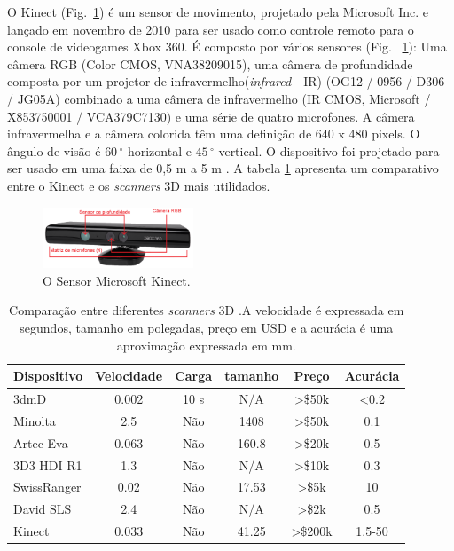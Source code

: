 O Kinect (Fig.~\ref{fig:kinect}) é um sensor de movimento, projetado pela Microsoft Inc. e lançado em novembro de 2010 para ser usado como controle remoto para o console de videogames Xbox 360. É composto por vários sensores (Fig. ~\ref{fig:kinect}): Uma câmera RGB (Color CMOS, VNA38209015), uma câmera de profundidade composta por um projetor de infravermelho(\textit{infrared} - IR) (OG12 / 0956 / D306 / JG05A) combinado a uma câmera de infravermelho (IR CMOS, Microsoft / X853750001 / VCA379C7130) e uma série de quatro microfones. A câmera infravermelha e a câmera colorida têm uma definição de 640 x 480 pixels. O ângulo de visão é $60\,^{\circ}$ horizontal e $45\,^{\circ}$ vertical. O dispositivo foi projetado para ser usado em uma faixa de 0,5 m a 5 m \cite{sevrin2015characterization}. A tabela \ref{table:comparativoScanners} apresenta um comparativo entre o Kinect e os \textit{scanners} 3D mais utilidados.

 \begin{figure}[h]
\centering
    \includegraphics[resolution=300,width=0.4\textwidth,natwidth=610,natheight=642]{images/kinect.png}
    \caption{O Sensor Microsoft Kinect.}
    \label{fig:kinect}
\end{figure}


 \begin{table}[h]
 \caption{Comparação entre diferentes \textit{scanners} 3D \cite{li2013using}.\newline A velocidade é expressada em segundos, tamanho em polegadas, preço em USD e a acurácia é uma aproximação expressada em mm.}
 \label{table:comparativoScanners}
 \begin{tabular}{|l|c|c|c|c|c|}
\hline  
 Dispositivo & Velocidade & Carga & tamanho & Preço & Acurácia \\ \hline  
 3dmD & 0.002 & 10 s & N/A & >\$50k & <0.2 \\ \hline  
 Minolta & 2.5 & Não & 1408 & >\$50k & 0.1 \\ \hline  
 Artec Eva & 0.063 & Não & 160.8 & >\$20k & 0.5 \\ \hline  
 3D3 HDI R1 & 1.3 & Não & N/A & >\$10k & 0.3 \\ \hline  
 SwissRanger & 0.02 & Não & 17.53 & >\$5k & 10 \\ \hline  
 David SLS & 2.4 & Não & N/A & >\$2k & 0.5 \\ \hline  
 Kinect & 0.033 & Não & 41.25 & >\$200k & 1.5-50 \\ \hline
\end{tabular}
\end{table}


